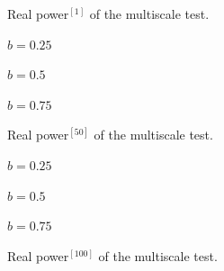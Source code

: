 \documentclass[12pt]{article}
\begin{document}
\begin{table}[t!]

\renewcommand{\arraystretch}{1.2}  
\footnotesize

\caption{Real power$^{[1]}$ of the multiscale test.}\label{tab:realpower1}
\vspace{-0.25cm}

\begin{subtable}[b]{0.32\textwidth}
\centering  
\caption{$b=0.25$}

\end{subtable}
\begin{subtable}[b]{0.32\textwidth}
\setcounter{subtable}{0}  
\centering  
\vspace{0.25cm} 
\caption{$b=0.5$}

\end{subtable}
\begin{subtable}[b]{0.32\textwidth}
\centering  
\vspace{0.25cm} \caption{$b=0.75$}

\end{subtable}
\vspace{0.5cm}

\caption{Real power$^{{[50]}}$ of the multiscale test.}\label{tab:realpower50}
\vspace{-0.25cm}

\begin{subtable}[b]{0.32\textwidth}
\centering  
\caption{$b=0.25$}

\end{subtable}
\begin{subtable}[b]{0.32\textwidth}
\setcounter{subtable}{0}  
\centering  
\vspace{0.25cm} 
\caption{$b=0.5$}

\end{subtable}
\begin{subtable}[b]{0.32\textwidth}
\centering  
\vspace{0.25cm} \caption{$b=0.75$}

\end{subtable}
\vspace{0.5cm}

\caption{Real power$^{[100]}$ of the multiscale test.}\label{tab:realpower100}
\vspace{-0.25cm}


\end{table}
\end{document}
